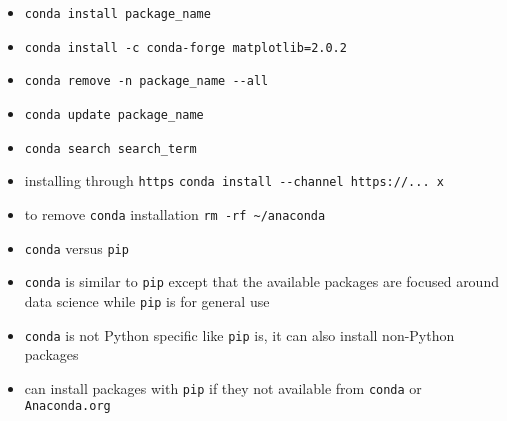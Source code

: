 \documentclass[onecolumn]{IEEEtran} %
\begin{document}
\begin{itemize}
        \bi
            \item \verb|conda install package_name|
            \item \verb|conda install -c conda-forge matplotlib=2.0.2|
            \item \verb|conda remove -n package_name --all|
            \item \verb|conda update package_name|
            \item \verb|conda search search_term|
        \ei
        \item installing through \verb|https|  \newline
        \verb|conda install --channel https://... x|
        \item to remove \verb|conda| installation \newline \verb|rm -rf ~/anaconda|
    \ei
    \item \verb|conda| versus \verb|pip|
    \bi
        \item \verb|conda| is similar to \verb|pip| except that the available packages are focused around data science while \verb|pip| is for general use
        \item \verb|conda| is not Python specific like \verb|pip| is, it can also install non-Python packages
        \item can install packages with \verb|pip| if they not available from \verb|conda| or \verb|Anaconda.org|


\end{itemize}
\end{document}
